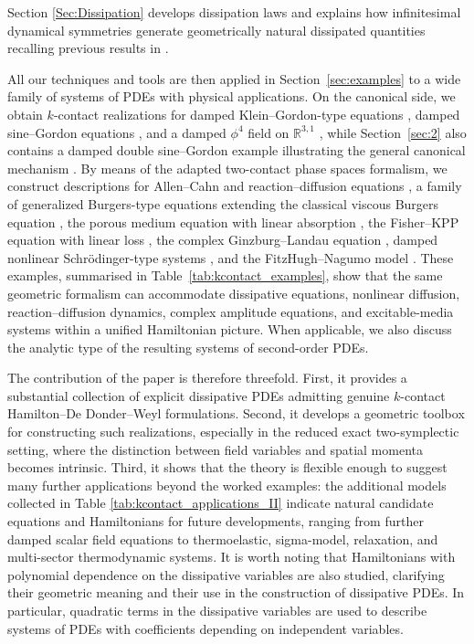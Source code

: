 \documentclass[11pt,a4paper]{article}
\theoremstyle{plain} \newtheorem{theorem}{Theorem}[section] \newtheorem{proposition}[theorem]{Proposition} \newtheorem{corollary}[theorem]{Corollary} \newtheorem{lemma}[theorem]{Lemma} \theoremstyle{definition} \newtheorem{definition}[theorem]{Definition} \theoremstyle{remark} \newtheorem{remark}[theorem]{Remark} \newtheorem{example}[theorem]{Example} %
\begin{document}
Section \ref{Sec:Dissipation} develops dissipation laws and explains how infinitesimal dynamical symmetries generate geometrically natural dissipated quantities recalling previous results in \cite{CCM_18,Riv_22}. 

All our techniques and tools are then applied in Section~\ref{sec:examples} to a wide family of systems of PDEs with physical applications. On the canonical side, we obtain \(k\)-contact realizations for damped Klein--Gordon-type equations \cite{WangCheng2005}, damped sine--Gordon equations \cite{McLaughlinScott1978,CostabileEtAl1978,CuevasMaraverKevrekidisWilliams2014}, and a damped \(\phi^4\) field on \(\mathbb R^{3,1}\) \cite{QuinteroSanchezMertens2001,LizunovaVanWezel2021}, while Section~\ref{sec:2} also contains a damped double sine--Gordon example illustrating the general canonical mechanism \cite{Popov2005,TakacsWagner2006}. By means of the adapted two-contact phase spaces formalism, we construct   descriptions for Allen--Cahn and reaction--diffusion equations \cite{AllenCahn1979,Fife1979}, a family of generalized Burgers-type equations extending the classical viscous Burgers equation \cite{Burgers1948}, the porous medium equation with linear absorption  \cite{Barenblatt1952,Aronson1986,Vazquez2007,BandleNanbuStakgold1998,Kwak1998}, the Fisher--KPP equation with linear loss \cite{Fisher1937,Kolmogorov1937,Murray2002,OrugantiShiShivaji2002,KurataShi2008,Wang2016}, the complex Ginzburg--Landau equation \cite{KuramotoTsuzuki1976,AransonKramer2002,CrossHohenberg1993,LugiatoLefever1987}, damped nonlinear Schr\"odinger-type systems \cite{SulemSulem1999}, and the FitzHugh--Nagumo model \cite{FitzHugh1961,Nagumo1962,Hastings1982FHN,ErmentroutTerman2010}. These examples, summarised in Table~\ref{tab:kcontact_examples}, show that the same geometric formalism can accommodate dissipative equations, nonlinear diffusion, reaction--diffusion dynamics, complex amplitude equations, and excitable-media systems within a unified Hamiltonian picture. When applicable, we also discuss the analytic type of the resulting systems of second-order PDEs.

The contribution of the paper is therefore threefold. First, it provides a substantial collection of explicit dissipative PDEs admitting genuine \(k\)-contact Hamilton--De Donder--Weyl formulations. Second, it develops a geometric toolbox for constructing such realizations, especially in the reduced exact two-symplectic setting, where the distinction between field variables and spatial momenta becomes intrinsic. Third, it shows that the theory is flexible enough to suggest many further applications beyond the worked examples: the additional models collected in Table \ref{tab:kcontact_applications_II} indicate natural candidate equations and Hamiltonians for future developments, ranging from further damped scalar field equations to thermoelastic, sigma-model, relaxation, and multi-sector thermodynamic systems. It is worth noting that Hamiltonians with polynomial dependence on the dissipative variables are also studied, clarifying their geometric meaning and their use in the construction of dissipative PDEs. In particular, quadratic terms in the dissipative variables are used to describe systems of PDEs with coefficients depending on independent variables.
\end{document}
